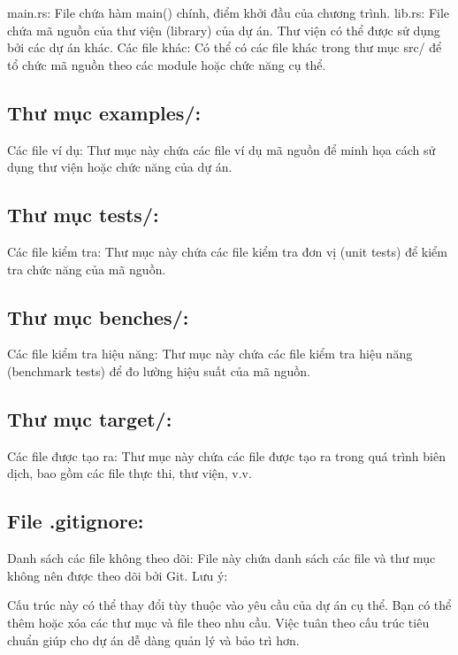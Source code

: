 \documentclass[
  letterpaper,
  DIV=11,
  numbers=noendperiod]{scrreprt}
\begin{document}
main.rs: File chứa hàm main() chính, điểm khởi đầu của chương trình.
lib.rs: File chứa mã nguồn của thư viện (library) của dự án. Thư viện có
thể được sử dụng bởi các dự án khác. Các file khác: Có thể có các file
khác trong thư mục src/ để tổ chức mã nguồn theo các module hoặc chức
năng cụ thể.

\subsection{Thư mục examples/:}\label{thux1b0-mux1ee5c-examples}

Các file ví dụ: Thư mục này chứa các file ví dụ mã nguồn để minh họa
cách sử dụng thư viện hoặc chức năng của dự án.

\subsection{Thư mục tests/:}\label{thux1b0-mux1ee5c-tests}

Các file kiểm tra: Thư mục này chứa các file kiểm tra đơn vị (unit
tests) để kiểm tra chức năng của mã nguồn.

\subsection{Thư mục benches/:}\label{thux1b0-mux1ee5c-benches}

Các file kiểm tra hiệu năng: Thư mục này chứa các file kiểm tra hiệu
năng (benchmark tests) để đo lường hiệu suất của mã nguồn.

\subsection{Thư mục target/:}\label{thux1b0-mux1ee5c-target}

Các file được tạo ra: Thư mục này chứa các file được tạo ra trong quá
trình biên dịch, bao gồm các file thực thi, thư viện, v.v.

\subsection{File .gitignore:}\label{file-.gitignore}

Danh sách các file không theo dõi: File này chứa danh sách các file và
thư mục không nên được theo dõi bởi Git. Lưu ý:

Cấu trúc này có thể thay đổi tùy thuộc vào yêu cầu của dự án cụ thể. Bạn
có thể thêm hoặc xóa các thư mục và file theo nhu cầu. Việc tuân theo
cấu trúc tiêu chuẩn giúp cho dự án dễ dàng quản lý và bảo trì hơn.
\end{document}
